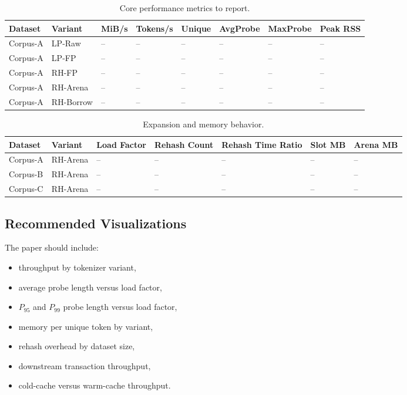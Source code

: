 \documentclass[11pt,a4paper]{article}
\begin{document}
\begin{table}[H]
\centering
\caption{Core performance metrics to report.}
\label{tab:metrics}
\small
\begin{adjustbox}{max width=\textwidth}
\begin{tabular}{llllllll}
\toprule
Dataset & Variant & MiB/s & Tokens/s & Unique & AvgProbe & MaxProbe & Peak RSS \\
\midrule
Corpus-A & LP-Raw & -- & -- & -- & -- & -- & -- \\
Corpus-A & LP-FP & -- & -- & -- & -- & -- & -- \\
Corpus-A & RH-FP & -- & -- & -- & -- & -- & -- \\
Corpus-A & RH-Arena & -- & -- & -- & -- & -- & -- \\
Corpus-A & RH-Borrow & -- & -- & -- & -- & -- & -- \\
\bottomrule
\end{tabular}
\end{adjustbox}
\end{table}

\begin{table}[H]
\centering
\caption{Expansion and memory behavior.}
\label{tab:expansion-memory}
\small
\begin{adjustbox}{max width=\textwidth}
\begin{tabular}{lllllll}
\toprule
Dataset & Variant & Load Factor & Rehash Count & Rehash Time Ratio & Slot MB & Arena MB \\
\midrule
Corpus-A & RH-Arena & -- & -- & -- & -- & -- \\
Corpus-B & RH-Arena & -- & -- & -- & -- & -- \\
Corpus-C & RH-Arena & -- & -- & -- & -- & -- \\
\bottomrule
\end{tabular}
\end{adjustbox}
\end{table}

\subsection{Recommended Visualizations}

The paper should include:

\begin{itemize}
\item throughput by tokenizer variant,
\item average probe length versus load factor,
\item \(P_{95}\) and \(P_{99}\) probe length versus load factor,
\item memory per unique token by variant,
\item rehash overhead by dataset size,
\item downstream transaction throughput,
\item cold-cache versus warm-cache throughput.
\end{itemize}
\end{document}
